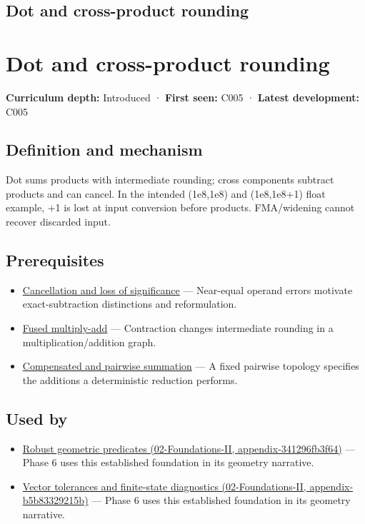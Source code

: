 \hypertarget{appendix-5aef4f13483a}{}
\section*{Dot and cross-product rounding}
\chapter{Dot and cross-product rounding}\label{appendix-5aef4f13483a-dot-and-cross-product-rounding}

\textbf{Curriculum depth:} Introduced · \textbf{First seen:} C005 · \textbf{Latest development:} C005

\section{Definition and mechanism}\label{appendix-5aef4f13483a-definition-and-mechanism}

Dot sums products with intermediate rounding; cross components subtract products and can cancel. In the intended (1e8,1e8) and (1e8,1e8+1) float example, +1 is lost at input conversion before products. FMA/widening cannot recover discarded input.

\section{Prerequisites}\label{appendix-5aef4f13483a-prerequisites}

\begin{itemize}
\tightlist
\item
  \hyperref[appendix-a2773a6a2f9d]{Cancellation and loss of significance} --- Near-equal operand errors motivate exact-subtraction distinctions and reformulation.
\item
  \hyperref[appendix-41e8ef22a21e]{Fused multiply-add} --- Contraction changes intermediate rounding in a multiplication/addition graph.
\item
  \hyperref[appendix-df318da57389]{Compensated and pairwise summation} --- A fixed pairwise topology specifies the additions a deterministic reduction performs.
\end{itemize}

\section{Used by}\label{appendix-5aef4f13483a-used-by}

\begin{itemize}
\tightlist
\item
  \href{../02-Foundations-II/main.pdf\#nameddest=appendix-341296fb3f64}{Robust geometric predicates (02-Foundations-II, appendix-341296fb3f64)} --- Phase 6 uses this established foundation in its geometry narrative.
\item
  \href{../02-Foundations-II/main.pdf\#nameddest=appendix-b5b83329215b}{Vector tolerances and finite-state diagnostics (02-Foundations-II, appendix-b5b83329215b)} --- Phase 6 uses this established foundation in its geometry narrative.
\end{itemize}

